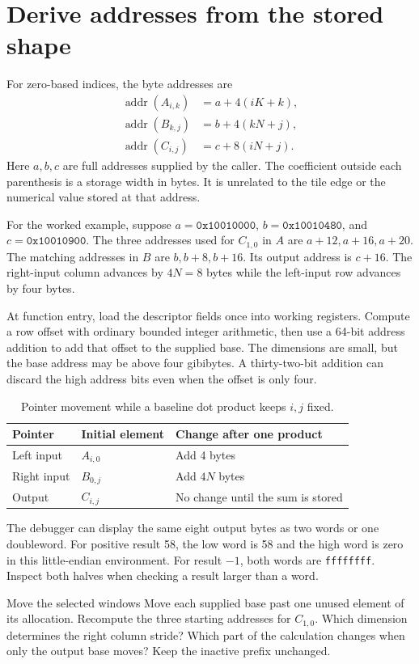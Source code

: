 \section{Derive addresses from the stored shape}
For zero-based indices, the byte addresses are
\begin{align*}
  \operatorname{addr}(A_{i,k}) & =a+4(iK+k), \\
  \operatorname{addr}(B_{k,j}) & =b+4(kN+j), \\
  \operatorname{addr}(C_{i,j}) & =c+8(iN+j).
\end{align*}
Here \(a,b,c\) are full addresses supplied by the caller. The coefficient outside
each parenthesis is a storage width in bytes. It is unrelated to the tile edge or
the numerical value stored at that address.

For the worked example, suppose \(a=\mathtt{0x10010000}\),
\(b=\mathtt{0x10010480}\), and \(c=\mathtt{0x10010900}\).
The three addresses used for \(C_{1,0}\) in \(A\) are \(a+12,a+16,a+20\).
The matching addresses in \(B\) are \(b,b+8,b+16\). Its output address is
\(c+16\). The right-input column advances by \(4N=8\) bytes while the
left-input row advances by four bytes.

At function entry, load the descriptor fields once into working registers.
Compute a row offset with ordinary bounded integer arithmetic, then use a
64-bit address addition to add that offset to the supplied base. The dimensions
are small, but the base address may be above four gibibytes. A thirty-two-bit
addition can discard the high address bits even when the offset is only four.

\begin{table}[htbp]
  \centering
  \caption{Pointer movement while a baseline dot product keeps \(i,j\) fixed.}
  \begin{tabular}{lll}
    \toprule
    Pointer     & Initial element & Change after one product          \\
    \midrule
    Left input  & \(A_{i,0}\)     & Add 4 bytes                       \\
    Right input & \(B_{0,j}\)     & Add \(4N\) bytes                  \\
    Output      & \(C_{i,j}\)     & No change until the sum is stored \\
    \bottomrule
  \end{tabular}
\end{table}

The debugger can display the same eight output bytes as two words or one
doubleword. For positive result 58, the low word is 58 and the high word is zero
in this little-endian environment. For result \(-1\), both words are
\texttt{ffffffff}. Inspect both halves when checking a result larger than a word.

\begin{MARSExercise}{Move the selected windows}
  Move each supplied base past one unused element of its allocation. Recompute the
  three starting addresses for \(C_{1,0}\). Which dimension determines the right
  column stride? Which part of the calculation changes when only the output base
  moves? Keep the inactive prefix unchanged.
\end{MARSExercise}
